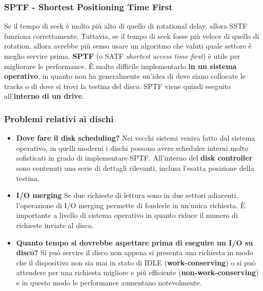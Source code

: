 \documentclass[12pt, twoside, letterpaper]{article}
\begin{document}
			\subsubsection{SPTF - Shortest Positioning Time First}
				Se il tempo di seek è molto più alto di quello di rotational delay, allora SSTF funziona correttamente. Tuttavia, se il tempo di seek fosse più veloce di quello di rotation, allora avrebbe più senso usare un algoritmo che valuti quale settore è meglio servire prima. \textbf{SPTF} (o SATF \textit{shortest access time first}) è utile per migliorare le performance. È molto difficile implementarlo \textbf{in un sistema operativo}, in quanto non ha generalmente un'idea di dove siano collocate le tracks o di dove si trovi la testina del disco. SPTF viene quindi eseguito all'\textbf{interno di un drive}.
				
			\subsubsection{Problemi relativi ai dischi}
				\begin{itemize}
					\item \textbf{Dove fare il disk scheduling?} Nei vecchi sistemi veniva fatto dal sistema operativo, in quelli moderni i dischi possono avere scheduler interni molto sofisticati in grado di implementare SPTF. All'interno del \textbf{disk controller} sono contenuti una serie di dettagli rilevanti, inclusa l'esatta posizione della testina.
					\item \textbf{I/O merging} Se due richieste di lettura sono in due settori adiacenti, l'operazione di I/O merging permette di fonderle in un'unica richiesta. È importante a livello di sistema operativo in quanto riduce il numero di richieste inviate al disco.
					\item \textbf{Quanto tempo si dovrebbe aspettare prima di eseguire un I/O su disco?} Si può servire il disco non appena si presenta una richiesta in modo che il dispositivo non sia mai in stato di IDLE (\textbf{work-conserving}) o si può attendere per una richiesta migliore e più efficiente (\textbf{non-work-conserving}) e in questo modo le performance aumentano notevolmente. 
				\end{itemize}
		
\end{document}
